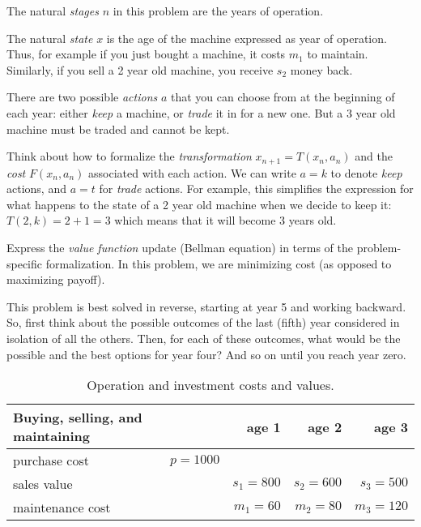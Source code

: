 \documentclass[a4paper]{article}
\begin{document}
\begin{compactitem}
\item
  The natural \emph{stages} $n$ in this problem are the years of operation.
\item
  The natural \emph{state} $x$ is the age of the machine expressed as year of operation.
  Thus, for example if you just bought a machine, it costs $m_1$ to maintain.
  Similarly, if you sell a 2 year old machine, you receive $s_2$ money back.
\item
  There are two possible \emph{actions} $a$ that you can choose from at the beginning of each year:
  either \emph{keep} a machine, or \emph{trade} it in for a new one.
  But a 3 year old machine must be traded and cannot be kept.
\item
  Think about how to formalize the \emph{transformation} $x_{n+1}=T(x_n,a_n)$ and the \emph{cost} $F(x_n,a_n)$ associated with each action.
  We can write $a=k$ to denote \emph{keep} actions, and $a=t$ for \emph{trade} actions.
  For example, this simplifies the expression for what happens to the state of a 2 year old machine when we decide to keep it: $T(2,k)=2+1=3$ which means that it will become 3 years old.
\item
  Express the \emph{value function} update (Bellman equation) in terms of the problem-specific formalization.
  In this problem, we are minimizing cost (as opposed to maximizing payoff).
\item
  This problem is best solved in reverse, starting at year 5 and working backward.
  So, first think about the possible outcomes of the last (fifth) year considered in isolation of all the others.
  Then, for each of these outcomes, what would be the possible and the best options for year four?
  And so on until you reach year zero.
\end{compactitem}

\vspace{3\baselineskip}

\begin{table}[h]
  \caption{Operation and investment costs and values.}\label{tab:costs}
  \centering
  \begin{tabular}{lrrrr}
    \toprule
    \multicolumn{2}{l}{Buying, selling, and maintaining} & age 1    & age 2    & age 3    \\
    \midrule
    purchase cost                     & $p=1000$ &           &           &           \\
    sales value                       &          & $s_1=800$ & $s_2=600$ & $s_3=500$ \\
    maintenance cost                  &          & $m_1=60$  & $m_2=80$  & $m_3=120$ \\
    \bottomrule
  \end{tabular}
\end{table}
\end{document}
